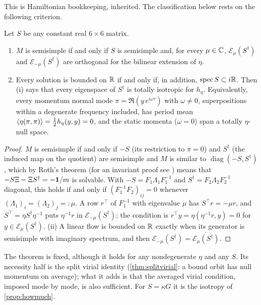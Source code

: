 This is Hamiltonian bookkeeping, inherited. The classification below rests on the following criterion.

\begin{theorem}
\label{bf:criterion}
Let $S$ be any constant real $6\times6$ matrix.
\begin{enumerate}[label=(\roman*),leftmargin=2.2em]
\item $M$ is semisimple if and only if $S$ is semisimple and, for every $\mu\in\mathbb{C}$, $\mathcal E_\mu(S^\dagger)$ and $\mathcal E_{-\mu}(S^\dagger)$ are
orthogonal for the bilinear extension of $\eta$.
\item Every solution is bounded on $\mathbb{R}$ if and only if, in addition, $\operatorname{spec} S\subset i\mathbb{R}$. Then (i) says that every eigenspace of $S^\dagger$ is
totally isotropic for $h_\eta$. Equivalently, every momentum normal mode $\pi=\Re(y\,e^{i\omega\tau})$ with $\omega\neq0$, superpositions within a
degenerate frequency included, has period mean $\langle\eta(\pi,\pi)\rangle=\tfrac12 h_\eta(y,y)=0$, and the static momenta ($\omega=0$) span a totally
$\eta$-null space.
\end{enumerate}
\end{theorem}

\begin{proof}
$M$ is semisimple if and only if $-S$ (its restriction to $\pi=0$) and $S^\dagger$ (the induced map on the quotient) are semisimple and $M$ is
similar to $\operatorname{diag}(-S,S^\dagger)$, which by Roth's theorem \cite{Roth52} (for an invariant proof see \cite{FlandersWimmer77}) means that $-S\Xi-\Xi S^\dagger=-\mathbf 1/m$ is solvable. With
$-S=F_1\Lambda_1F_1^{-1}$ and $S^\dagger=F_2\Lambda_2F_2^{-1}$ diagonal, this holds if and only if $(F_1^{-1}F_2)_{ij}=0$ whenever
$(\Lambda_1)_i=(\Lambda_2)_j=:\mu$. A row $r^{\!\top}$ of $F_1^{-1}$ with eigenvalue $\mu$ has $S^{\!\top}r=-\mu r$, and $S^{\!\top}=\eta S^\dagger\eta^{-1}$
puts $\eta^{-1}r$ in $\mathcal E_{-\mu}(S^\dagger)$; the condition is $r^{\!\top}y=\eta(\eta^{-1}r,y)=0$ for $y\in\mathcal E_\mu(S^\dagger)$. (ii) A linear
flow is bounded on $\mathbb{R}$ exactly when its generator is semisimple with imaginary spectrum, and then $\mathcal E_{-\mu}(S^\dagger)=\overline{\mathcal E_\mu(S^\dagger)}$.
\end{proof}

The theorem is fixed, although it holds for any nondegenerate $\eta$ and any $S$. Its necessity half is the split virial identity
(\cref{thm:splitvirial}: a bound orbit has null momentum on average); what it adds is that the averaged virial condition, imposed mode by mode, is
also sufficient. For $S=\kappa G$ it is the isotropy of \cref{prop:howmuch}.

